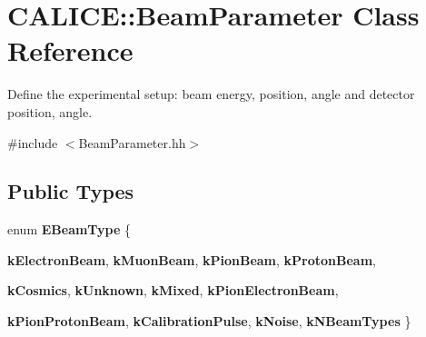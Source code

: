 \section{CALICE::BeamParameter Class Reference}
\label{classCALICE_1_1BeamParameter}


Define the experimental setup: beam energy, position, angle and detector position, angle.  


{\ttfamily \#include $<$BeamParameter.hh$>$}\subsection*{Public Types}
\begin{DoxyCompactItemize}
\item 
enum {\bfseries EBeamType} \{ \par
{\bfseries kElectronBeam}, 
{\bfseries kMuonBeam}, 
{\bfseries kPionBeam}, 
{\bfseries kProtonBeam}, 
\par
{\bfseries kCosmics}, 
{\bfseries kUnknown}, 
{\bfseries kMixed}, 
{\bfseries kPionElectronBeam}, 
\par
{\bfseries kPionProtonBeam}, 
{\bfseries kCalibrationPulse}, 
{\bfseries kNoise}, 
{\bfseries kNBeamTypes}
 \}
\end{DoxyCompactItemize}
